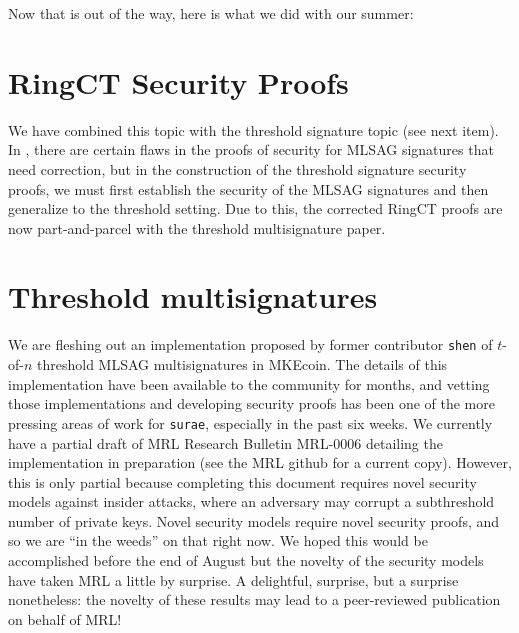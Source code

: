 \documentclass[12pt,english]{mrl}
\theoremstyle{definition}
\numberwithin{equation}{section}
\numberwithin{figure}{section}
\numberwithin{equation}{section}
\numberwithin{equation}{section}
\numberwithin{figure}{section}
\begin{document}
Now that is out of the way, here is what we did with our summer:


\section{RingCT Security Proofs} 

We have combined this topic with the threshold signature topic (see next item). In \cite{noether2016ring}, there are certain flaws in the proofs of security for MLSAG signatures that need correction, but in the construction of the threshold signature security proofs, we must first establish the security of the MLSAG signatures and then generalize to the threshold setting. Due to this, the corrected RingCT proofs are now part-and-parcel with the threshold multisignature paper.
    
    
\section{Threshold multisignatures} 

We are fleshing out an implementation proposed by former contributor \texttt{shen} of $t$-of-$n$ threshold MLSAG multisignatures in MKEcoin. The details of this implementation have been available to the community for months, and vetting those implementations and developing security proofs has been one of the more pressing areas of work for \texttt{surae}, especially in the past six weeks. We currently have a partial draft of MRL Research Bulletin MRL-0006 detailing the implementation in preparation (see the MRL github for a current copy). However, this is only partial because completing this document requires novel security models against insider attacks, where an adversary may corrupt a subthreshold number of private keys. Novel security models require novel security proofs, and so we are ``in the weeds'' on that right now. We hoped this would be accomplished before the end of August but the novelty of the security models have taken MRL a little by surprise. A delightful, surprise, but a surprise nonetheless: the novelty of these results may lead to a peer-reviewed publication on behalf of MRL!
    
\end{document}
